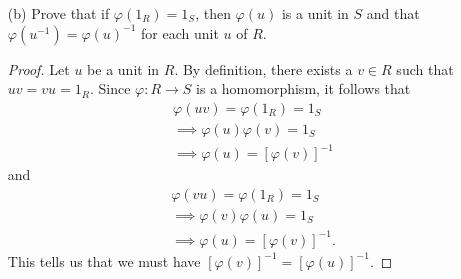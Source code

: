 \documentclass[a4paper]{article}
\begin{document}
\begin{problem}
\begin{enumerate}
\begin{proof}
           We proceed to prove the next result via contrapositive. That is, we want to show that \( S  \) is NOT an integral domain. To this end, we need to show that there exists an element \( s  \) in \( S  \) such that \( s \) is a zero divisor. From our assumption, there exists a ring homomorphism \( \psi : R \to S \) such that \( \psi({1}_{R}) \neq {1}_{S} \). Then by our previous result, \( \psi({1}_{R})  \) is a zero divisor in \( S  \); that is, \( s = \psi({1}_{R}) \neq 0  \). Hence, \( S  \) is not an integral domain.
           \end{proof}
        \item[(b)] Prove that if \( \varphi({1}_{R}) = {1}_{S} \), then \( \varphi(u)  \) is a unit in \( S  \) and that \( \varphi(u^{-1}) = \varphi(u)^{-1} \) for each unit \( u  \) of \( R  \).
            \begin{proof}
            Let \( u  \) be a unit in \( R  \). By definition, there exists a \( v \in R \) such that \( uv  = vu = {1}_{R} \). Since \( \varphi: R \to  S  \) is a homomorphism, it follows that 
            \begin{align*}
                &\varphi(uv) = \varphi({1}_{R}) = {1}_{S} \\
                &\implies \varphi(u) \varphi(v) = {1}_{S} \\
                &\implies \varphi(u) = [\varphi(v)]^{-1} 
            \end{align*}
            and
            \begin{align*}
                &\varphi(vu) = \varphi({1}_{R}) = {1}_{S} \\
                &\implies \varphi(v)\varphi(u) = {1}_{S} \\
                &\implies \varphi(u) = [\varphi(v)]^{-1}.
            \end{align*}
            This tells us that we must have \( [\varphi(v)]^{-1} = [\varphi(u)]^{-1}  \).
            \end{proof}
   \end{enumerate}
\end{problem}
\end{document}
